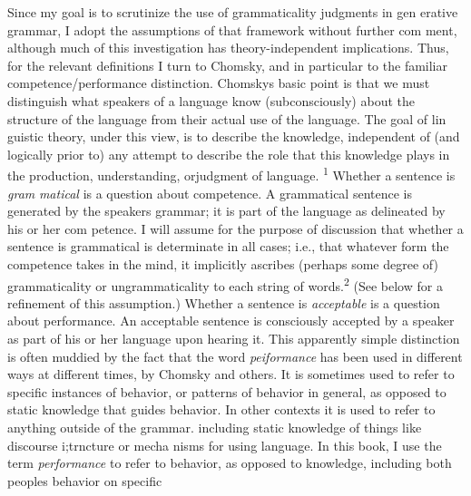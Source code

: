 \begin{styleTextbody}
Since my goal is to scrutinize the use of grammaticality judgments in gen\- erative grammar, I adopt the assumptions of that framework without further com\- ment, although much of this investigation has theory-independent implications. Thus, for the relevant definitions I turn to Chomsky, and in particular to the familiar competence/performance distinction. Chomsky{\textquotesingle}s basic point is that we must distinguish what speakers of a language know (subconsciously) about the structure of the language from their actual use of the language. The goal of lin\- guistic theory, under this view, is to describe the knowledge, independent of (and logically prior to) any attempt to describe the role that this knowledge plays in the production, understanding, orjudgment of language. \textsuperscript{1}\textsuperscript{ }Whether a sentence is \textit{gram\-}\textit{ }\textit{matical}\textit{ }is a question about competence. A grammatical sentence is generated by the speaker{\textquotesingle}s grammar; it is part of the language as delineated by his or her com\- petence. I will assume for the purpose of discussion that whether a sentence is grammatical is determinate in all cases; i.e., that whatever form the competence takes in the mind, it implicitly ascribes (perhaps some degree of) grammaticality or ungrammaticality to each string of words.\textsuperscript{2}\textsuperscript{ }(See below for a refinement of this assumption.) Whether a sentence is \textit{acceptable}\textit{ }is a question about performance. An acceptable sentence is consciously accepted by a speaker as part of his or her language upon hearing it. This apparently simple distinction is often muddied by the fact that the word \textit{peiformance}\textit{ }has been used in different ways at different times, by Chomsky and others. It is sometimes used to refer to specific instances of behavior, or patterns of behavior in general, as opposed to static knowledge that guides behavior. In other contexts it is used to refer to anything outside of the grammar. including static knowledge of things like discourse i;trncture or mecha nisms for using language. In this book, I use the term \textit{performance}\textit{ }to refer to behavior, as opposed to knowledge, including both people{\textquotesingle}s behavior on specific
\end{styleTextbody}



